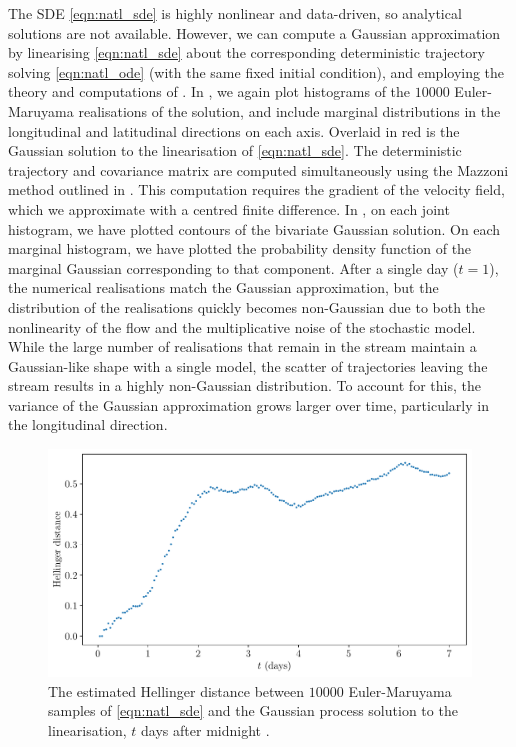 The SDE \cref{eqn:natl_sde} is highly nonlinear and data-driven, so analytical solutions are not available.
However, we can compute a Gaussian approximation by linearising \cref{eqn:natl_sde} about the corresponding deterministic trajectory solving \cref{eqn:natl_ode} (with the same fixed initial condition), and employing the theory and computations of .
In , we again plot histograms of the \(10000\) Euler-Maruyama realisations of the solution, and include marginal distributions in the longitudinal and latitudinal directions on each axis.
Overlaid in red is the Gaussian solution to the linearisation of \cref{eqn:natl_sde}.
The deterministic trajectory and covariance matrix are computed simultaneously using the Mazzoni method outlined in .
This computation requires the gradient of the velocity field, which we approximate with a centred finite difference.
In , on each joint histogram, we have plotted contours of the bivariate Gaussian solution.
On each marginal histogram, we have plotted the probability density function of the marginal Gaussian corresponding to that component.
After a single day (\(t = 1\)), the numerical realisations match the Gaussian approximation, but the distribution of the realisations quickly becomes non-Gaussian due to both the nonlinearity of the flow and the multiplicative noise of the stochastic model.
While the large number of realisations that remain in the stream maintain a Gaussian-like shape with a single model, the scatter of trajectories leaving the stream results in a highly non-Gaussian distribution.
To account for this, the variance of the Gaussian approximation grows larger over time, particularly in the longitudinal direction.

\begin{figure}
	\begin{center}
		\includegraphics[width=\textwidth]{chp06_applications/figures/gulf_stream/traj_stoch_hell_dist_0.25}
		\caption{The estimated Hellinger distance between \(10000\) Euler-Maruyama samples of \cref{eqn:natl_sde} and the Gaussian process solution to the linearisation, \(t\) days after midnight .}
		\label{fig:natl_hell}
	\end{center}
\end{figure}

